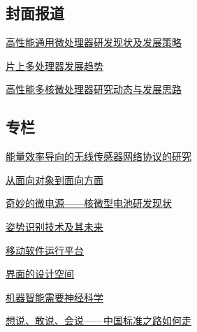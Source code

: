 \documentclass[a4paper]{article}
\begin{document}
\subsection{封面报道}
\href{http://history.ccf.org.cn/resources/1190201776262/2010/04/15/001010.pdf}{高性能通用微处理器研发现状及发展策略}

\href{http://history.ccf.org.cn/resources/1190201776262/2010/04/15/001023.pdf}{片上多处理器发展趋势}

\href{http://history.ccf.org.cn/resources/1190201776262/2010/04/15/001031.pdf}{高性能多核微处理器研究动态与发展思路}

\subsection{专栏}
\href{http://history.ccf.org.cn/resources/1190201776262/2010/04/15/001038.pdf}{能量效率导向的无线传感器网络协议的研究}

\href{http://history.ccf.org.cn/resources/1190201776262/2010/04/15/001047.pdf}{从面向对象到面向方面}

\href{http://history.ccf.org.cn/resources/1190201776262/2010/04/15/001050.pdf}{奇妙的微电源——核微型电池研发现状}

\href{http://history.ccf.org.cn/resources/1190201776262/2010/04/15/001056.pdf}{姿势识别技术及其未来}

\href{http://history.ccf.org.cn/resources/1190201776262/2010/04/15/001060.pdf}{移动软件运行平台}

\href{http://history.ccf.org.cn/resources/1190201776262/2010/04/15/001065.pdf}{界面的设计空间}

\href{http://history.ccf.org.cn/resources/1190201776262/2010/04/15/001068.pdf}{机器智能需要神经科学}

\href{http://history.ccf.org.cn/resources/1190201776262/2010/04/15/001072.pdf}{想说、敢说、会说——中国标准之路如何走}
\end{document}
